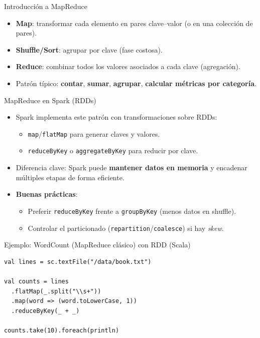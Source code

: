 \documentclass{beamer}
\begin{document}
\begin{frame}{Introducción a MapReduce}
\begin{itemize}
  \item \textbf{Map}: transformar cada elemento en pares clave--valor (o en una colección de pares).
  \item \textbf{Shuffle/Sort}: agrupar por clave (fase costosa).
  \item \textbf{Reduce}: combinar todos los valores asociados a cada clave (agregación).
  \item Patrón típico: \textbf{contar}, \textbf{sumar}, \textbf{agrupar}, \textbf{calcular métricas por categoría}.
\end{itemize}
\end{frame}

\begin{frame}{MapReduce en Spark (RDDs)}
\begin{itemize}
  \item Spark implementa este patrón con transformaciones sobre RDDs:
  \begin{itemize}
    \item \texttt{map}/\texttt{flatMap} para generar claves y valores.
    \item \texttt{reduceByKey} o \texttt{aggregateByKey} para reducir por clave.
  \end{itemize}
  \item Diferencia clave: Spark puede \textbf{mantener datos en memoria} y encadenar múltiples etapas de forma eficiente.
  \item \textbf{Buenas prácticas}:
  \begin{itemize}
    \item Preferir \texttt{reduceByKey} frente a \texttt{groupByKey} (menos datos en shuffle).
    \item Controlar el particionado (\texttt{repartition}/\texttt{coalesce}) si hay \emph{skew}.
  \end{itemize}
\end{itemize}
\end{frame}

\begin{frame}[fragile]{Ejemplo: WordCount (MapReduce clásico) con RDD (Scala)}
\begin{verbatim}
val lines = sc.textFile("/data/book.txt")

val counts = lines
  .flatMap(_.split("\\s+"))
  .map(word => (word.toLowerCase, 1))
  .reduceByKey(_ + _)

counts.take(10).foreach(println)
\end{verbatim}
\end{frame}
\end{document}
